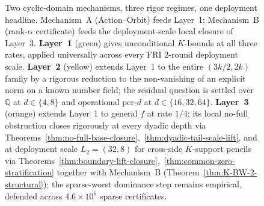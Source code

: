 \documentclass[11pt]{article}
\theoremstyle{definition}
\theoremstyle{remark}
\begin{document}
\begin{figure}[!t]
\caption{Two cyclic-domain mechanisms, three rigor regimes, one
deployment headline. Mechanism~A (Action--Orbit) feeds Layer~1;
Mechanism~B (rank-$\alpha$ certificate) feeds the deployment-scale
local closure of Layer~3.
\textbf{Layer~1} (green) gives unconditional $K$-bounds at all three
rates, applied universally across every FRI 2-round deployment scale.
\textbf{Layer~2} (yellow) extends Layer~1 to the entire $(3k/2, 2k)$
family by a rigorous reduction to the non-vanishing of an explicit
norm on a known number field; the residual question is settled over
$\mathbb{Q}$ at $d \in \{4, 8\}$ and operational per-$d$ at
$d \in \{16, 32, 64\}$. \textbf{Layer~3} (orange) extends Layer~1 to
general $f$ at rate $1/4$; its local no-full obstruction closes
rigorously at every dyadic depth via
Theorems~\ref{thm:no-full-base-closure},~\ref{thm:dyadic-tail-scale-lift},
and at deployment scale $L_2 = (32, 8)$ for cross-side $K$-support
pencils via Theorems~\ref{thm:boundary-lift-closure},~\ref{thm:common-zero-stratification}
together with Mechanism~B
(Theorem~\ref{thm:K-BW-2-structural}); the sparse-worst dominance step
remains empirical, defended across $4.6 \times 10^6$ sparse certificates.}
\label{fig:proof-map}
\end{figure}
\end{document}
